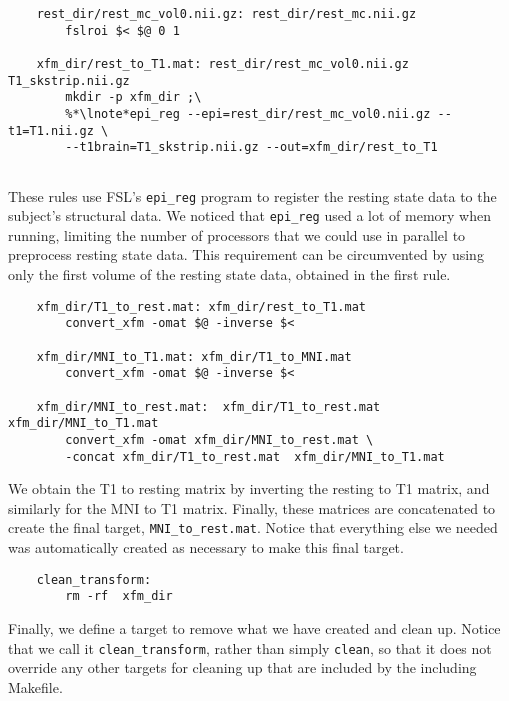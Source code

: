 \begin{lstlisting}
	rest_dir/rest_mc_vol0.nii.gz: rest_dir/rest_mc.nii.gz
		fslroi $< $@ 0 1

	xfm_dir/rest_to_T1.mat: rest_dir/rest_mc_vol0.nii.gz T1_skstrip.nii.gz
		mkdir -p xfm_dir ;\
		%*\lnote*epi_reg --epi=rest_dir/rest_mc_vol0.nii.gz --t1=T1.nii.gz \
		--t1brain=T1_skstrip.nii.gz --out=xfm_dir/rest_to_T1
		
\end{lstlisting}

These rules use FSL's \texttt{epi_reg} program to register the resting
state data to the subject's structural data. We noticed that
\texttt{epi_reg} used a lot of memory when running, limiting the
number of processors that we could use in parallel to preprocess
resting state data. \lnum{3} This requirement can be circumvented by using only
the first volume of the resting state data, obtained in the first
rule. 


\begin{lstlisting}
	xfm_dir/T1_to_rest.mat: xfm_dir/rest_to_T1.mat
		convert_xfm -omat $@ -inverse $<

	xfm_dir/MNI_to_T1.mat: xfm_dir/T1_to_MNI.mat
		convert_xfm -omat $@ -inverse $<

	xfm_dir/MNI_to_rest.mat:  xfm_dir/T1_to_rest.mat xfm_dir/MNI_to_T1.mat
		convert_xfm -omat xfm_dir/MNI_to_rest.mat \
		-concat xfm_dir/T1_to_rest.mat  xfm_dir/MNI_to_T1.mat
\end{lstlisting}
We obtain the T1 to resting matrix by inverting the resting to T1
matrix, and similarly for the MNI to T1 matrix. Finally, these
matrices are concatenated to create the final target,
\texttt{MNI_to_rest.mat}. Notice that everything else we needed was
automatically created as necessary to make this final target.


\begin{lstlisting}
	clean_transform: 
		rm -rf  xfm_dir 
\end{lstlisting}
Finally, we define a target to remove what we have created and clean
up. Notice that we call it \texttt{clean_transform}, rather than simply
\texttt{clean}, so that it does not override any other targets for
cleaning up that are included by the including Makefile. 